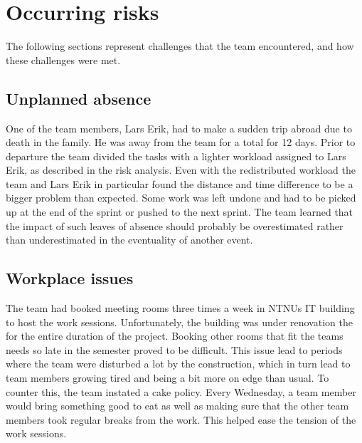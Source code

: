 \section{Occurring risks}
The following sections represent challenges that the team encountered, and how these challenges were met.

\subsection{Unplanned absence}
One of the team members, Lars Erik, had to make a sudden trip abroad due to
death in the family. He was away from the team for a total for 12 days. Prior
to departure the team divided the tasks with a lighter workload assigned to Lars
Erik, as described in the risk analysis. Even with the redistributed workload
the team and Lars Erik in particular found the distance and time difference to
be a bigger problem than expected. Some work was left undone and had to be
picked up at the end of the sprint or pushed to the next sprint. The team
learned that the impact of such leaves of absence should probably be
overestimated rather than underestimated in the eventuality of another event.

\subsection{Workplace issues}
The team had booked meeting rooms three times a week in NTNUs IT building to host the work sessions. Unfortunately, the building was under renovation the for the entire duration of the project. Booking other rooms that fit the teams needs so late in the semester proved to be difficult. This issue lead to periods where the team were disturbed a lot by the construction, which in turn lead to team members growing tired and being a bit more on edge than usual. To counter this, the team instated a cake policy. Every Wednesday, a team member would bring something good to eat as well as making sure that the other team members took regular breaks from the work. This helped ease the tension of the work sessions.

\begin{comment}
\subsection{Excessive discussion}
The team has seen that much time is being spent discussing a lot. The discussion was of importance, but it drained too much of the time. To solve this, it was decided that there should be set a certain amount of time for the discussions. Should the discussions last longer than the time set, the project leader's task was to focus on ending the discussions, and instead perform a democratic vote based on the arguments that were presented. 
\end{comment}


